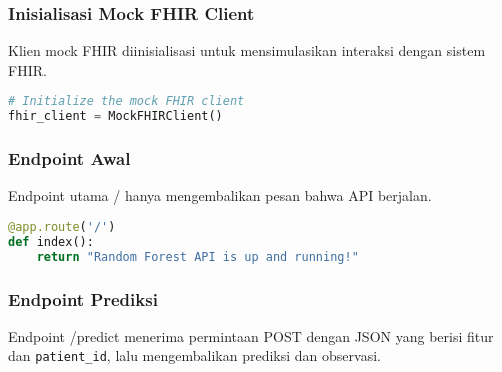 \subsubsection{Inisialisasi Mock FHIR Client}
Klien mock FHIR diinisialisasi untuk mensimulasikan interaksi dengan sistem FHIR.
\begin{lstlisting}[language=Python, caption=Inisialisasi Mock FHIR Client]
# Initialize the mock FHIR client
fhir_client = MockFHIRClient()
\end{lstlisting}

\subsubsection{Endpoint Awal}
Endpoint utama / hanya mengembalikan pesan bahwa API berjalan.
\begin{lstlisting}[language=Python, caption=Endpoint Utama]
@app.route('/')
def index():
    return "Random Forest API is up and running!"
\end{lstlisting}

\subsubsection{Endpoint Prediksi}
Endpoint /predict menerima permintaan POST dengan JSON yang berisi fitur dan \texttt{patient\_id}, lalu mengembalikan prediksi dan observasi.